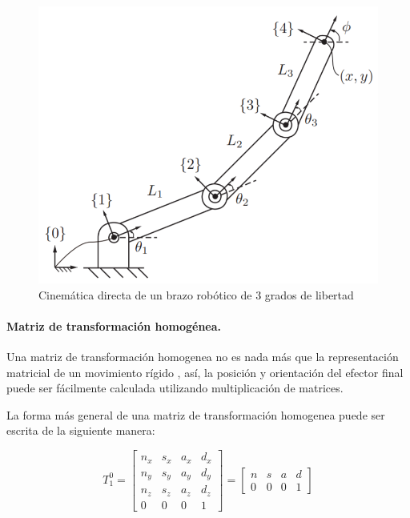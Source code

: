 \begin{figure}
    \centering
    \includegraphics[scale=0.6]{./img/chapter3/forwardkinematic.png}
    \caption{Cinemática directa de un brazo robótico de 3 grados de libertad \cite{University2017}}
    \label{fig:forwardkinematic2}
\end{figure}

\paragraph{Matriz de transformación homogénea.}

Una matriz de transformación homogenea no es nada más que la representación matricial de un movimiento rígido \cite{Spong2005}, así, la posición y orientación del efector final puede ser fácilmente calculada utilizando multiplicación de matrices.

La forma más general de una matriz de transformación homogenea puede ser escrita de la siguiente manera:

\begin{equation}
T^0_1 =
\begin{bmatrix}
n_x & s_x & a_x & d_x\\
n_y & s_y & a_y & d_y\\
n_z & s_z & a_z & d_z\\
0 & 0 & 0 & 1
\end{bmatrix} = 
\begin{bmatrix}
n & s & a & d\\
0 & 0 & 0 & 1
\end{bmatrix}
\end{equation}

